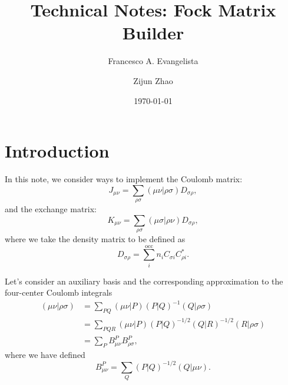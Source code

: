 \documentclass[aip,preprint]{revtex4-1}
\begin{document}
\title{Technical Notes: Fock Matrix Builder}

\author{Francesco A. Evangelista}
\author{Zijun Zhao}

\date{\today}

\maketitle

\section{Introduction}
In this note, we consider ways to implement the 
Coulomb matrix:
\begin{equation}
J_{\mu \nu} = \sum_{\rho \sigma} (\mu \nu | \rho \sigma) D_{\sigma \rho},
\end{equation}
and the exchange matrix:
\begin{equation}
K_{\mu \nu} = \sum_{\rho \sigma} (\mu \sigma | \rho \nu) D_{\sigma \rho},
\end{equation}
where we take the density matrix to be defined as
\begin{equation}
D_{\sigma \rho} = \sum_i^{\mathrm{occ}} n_i C_{\sigma i} C^*_{\rho i}.
\end{equation}

Let's consider an auxiliary basis and the corresponding approximation to the four-center Coulomb integrals
\begin{equation}
\begin{split}
(\mu \nu | \rho \sigma) & = \sum_{PQ} (\mu \nu | P) (P|Q)^{-1} (Q|\rho \sigma) \\
& = \sum_{PQR} (\mu \nu | P) (P|Q)^{-1/2} (Q|R)^{-1/2} (R|\rho \sigma) \\
& = \sum_{P} B^{P}_{\mu \nu} B^{P}_{\rho \sigma},
\end{split}
\end{equation}
where we have defined
\begin{equation}
B^{P}_{\mu \nu} = \sum_Q (P|Q)^{-1/2} (Q|\mu \nu).
\end{equation}
\end{document}
